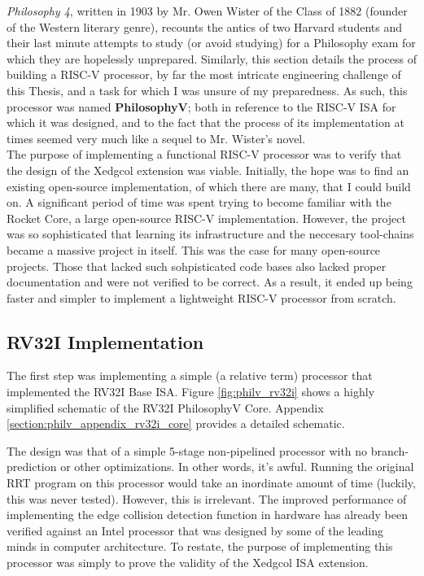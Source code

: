 \textit{Philosophy 4}, written in 1903 by Mr. Owen Wister of the Class of 1882 (founder of the Western literary genre), recounts the antics of two Harvard students and their last minute attempts to study (or avoid studying) for a Philosophy exam for which they are hopelessly unprepared. Similarly, this section details the process of building a RISC-V processor, by far the most intricate engineering challenge of this Thesis, and a task for which I was unsure of my preparedness. As such, this processor was named \textbf{PhilosophyV}; both in reference to the RISC-V ISA for which it was designed, and to the fact that the process of its implementation at times seemed very much like a sequel to Mr. Wister's novel. \\

The purpose of implementing a functional RISC-V processor was to verify that the design of the Xedgcol extension was viable. Initially, the hope was to find an existing open-source implementation, of which there are many, that I could build on. A significant period of time was spent trying to become familiar with the Rocket Core\cite{ChipsAlliance2020}, a large open-source RISC-V implementation. However, the project was so sophisticated that learning its infrastructure and the neccesary tool-chains became a massive project in itself. This was the case for many open-source projects. Those that lacked such sohpisticated code bases also lacked proper documentation and were not verified to be correct. As a result, it ended up being faster and simpler to implement a lightweight RISC-V processor from scratch. 

    \subsection{RV32I Implementation}
        
        The first step was implementing a simple (a relative term) processor that implemented the RV32I Base ISA. Figure \ref{fig:philv_rv32i} shows a highly simplified schematic of the RV32I PhilosophyV Core. Appendix \ref{section:philv_appendix_rv32i_core} provides a detailed schematic.

        The design was that of a simple 5-stage non-pipelined processor with no branch-prediction or other optimizations. In other words, it's awful. Running the original \gls{RRT} program on this processor would take an inordinate amount of time (luckily, this was never tested). However, this is irrelevant. The improved performance of implementing the edge collision detection function in hardware has already been verified against an Intel processor that was designed by some of the leading minds in computer architecture. To restate, the purpose of implementing this processor was simply to prove the validity of the Xedgcol ISA extension.

